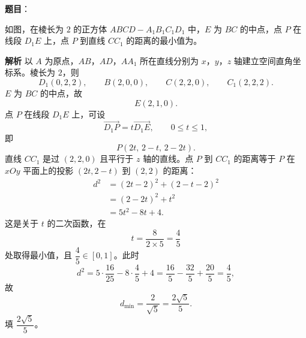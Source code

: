 \begin{answer}

\textbf{题目}：

如图，在棱长为 $2$ 的正方体 $ABCD-A_1B_1C_1D_1$ 中，$E$ 为 $BC$ 的中点，点 $P$ 在线段 $D_1E$ 上，点 $P$ 到直线 $CC_1$ 的距离的最小值为\gkblank{}。
\nopagebreak[4]
\begin{center}\end{center}
\nopagebreak[4]
\textbf{解析}
以 $A$ 为原点，$AB$，$AD$，$AA_1$ 所在直线分别为 $x$，$y$，$z$ 轴建立空间直角坐标系。棱长为 $2$，则
\nopagebreak[4]
\[D_1(0,2,2),\qquad B(2,0,0),\qquad C(2,2,0),\qquad C_1(2,2,2).\]
$E$ 为 $BC$ 的中点，故
\nopagebreak[4]
\[E(2,1,0).\]
点 $P$ 在线段 $D_1E$ 上，可设
\nopagebreak[4]
\[\overrightarrow{D_1P}=t\overrightarrow{D_1E},\qquad 0\leqslant t\leqslant1,\]
即
\nopagebreak[4]
\[P(2t,\,2-t,\,2-2t).\]
直线 $CC_1$ 是过 $(2,2,0)$ 且平行于 $z$ 轴的直线。点 $P$ 到 $CC_1$ 的距离等于 $P$ 在 $xOy$ 平面上的投影 $(2t,2-t)$ 到 $(2,2)$ 的距离：
\nopagebreak[4]
\[\begin{aligned}
d^2&=(2t-2)^2+(2-t-2)^2\\
&=(2-2t)^2+t^2\\
&=5t^2-8t+4.
\end{aligned}\]
这是关于 $t$ 的二次函数，在
\nopagebreak[4]
\[t=\frac{8}{2\times5}=\frac45\]
处取得最小值，且 $\dfrac45\in[0,1]$。此时
\nopagebreak[4]
\[d^2=5\cdot\frac{16}{25}-8\cdot\frac45+4=\frac{16}5-\frac{32}5+\frac{20}5=\frac45,\]
故
\nopagebreak[4]
\[d_{\min}=\frac{2}{\sqrt5}=\frac{2\sqrt5}5.\]
填 $\dfrac{2\sqrt5}5$。


\end{answer}

